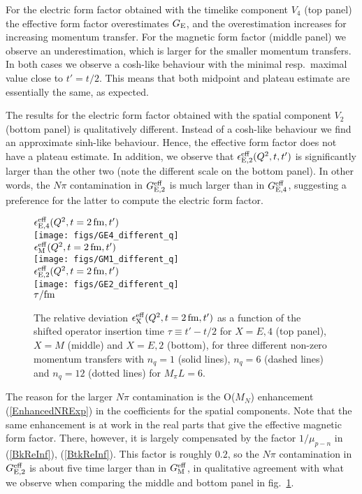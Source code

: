 \documentclass[11pt,prd,aps,showpacs,eqsecnum,floatfix,nofootinbib,preprint,tightenlines]{revtex4}
\newcommand{\pref}[1]{(\ref{#1})}
\begin{document}
For the electric form factor obtained with the timelike component $V_4$ (top panel) the effective form factor overestimates $G_{\rm E}$, and the overestimation increases for increasing momentum transfer. For the magnetic form factor (middle panel) we observe an underestimation, which is larger for the smaller momentum transfers. In both cases we observe a cosh-like behaviour with the minimal resp.\ maximal value close to $t'=t/2$. This means that both midpoint and plateau estimate are essentially the same, as expected.

The results for the electric form factor obtained with the spatial component $V_2$ (bottom panel) is qualitatively different. Instead of a cosh-like behaviour we find an approximate sinh-like behaviour. Hence, the effective form factor does not have a plateau estimate. In addition, we observe that $\epsilon^{\rm eff}_{\rm E, 2}(Q^2,t,t')$  is significantly larger than the other two (note the different scale on the bottom panel). In other words, the $N\pi$ contamination in $G^{\rm eff}_{\rm E,2}$ is much larger than in $G^{\rm eff}_{\rm E,4}$, suggesting a preference for the latter to compute the electric form factor.

%
\begin{figure}[p]
\begin{center}
$\epsilon^{\rm eff}_{\rm E,4}(Q^2,t=2\,{\rm fm},t')$\\
\texttt{[image: figs/GE4\_different\_q]}\\[4ex]
$\epsilon^{\rm eff}_{\rm M}(Q^2,t=2\,{\rm fm},t')$\\
\texttt{[image: figs/GM1\_different\_q]}\\[4ex]
$\epsilon^{\rm eff}_{\rm E,2}(Q^2,t=2\,{\rm fm},t')$\\
\texttt{[image: figs/GE2\_different\_q]}\\[1ex]
$\tau/{\rm fm}$\\[2ex]
\caption{The relative deviation $\epsilon^{\rm eff}_{\rm X}(Q^2,t=2\,{\rm fm},t')$ as a function of the shifted operator insertion time $\tau\equiv t'-t/2$ for $X=E,4$ (top panel), $X=M$ (middle) and $X=E,2$ (bottom), for three different non-zero momentum transfers with $n_q=1$ (solid lines), $n_q=6$ (dashed lines) and $n_q=12$ (dotted lines) for $M_\pi L=6$. }
\label{fig:epsEff}
\end{center}
\end{figure}

The reason for the larger $N\pi$ contamination is the O($M_N$) enhancement \pref{EnhancedNRExp} in the coefficients for the spatial components. Note  that the same enhancement is at work in the real parts that give the effective magnetic form factor. There, however, it is largely compensated by the factor $1/\mu_{p-n}$ in \pref{BkReInf}, \pref{BtkReInf}. This factor is roughly $0.2$, so the $N\pi$ contamination in $G^{\rm eff}_{\rm E,2}$ is about five time larger than in $G^{\rm eff}_{\rm M}$, in qualitative agreement with 
what we observe when comparing the middle and bottom panel in fig.\ \ref{fig:epsEff}.
\end{document}
